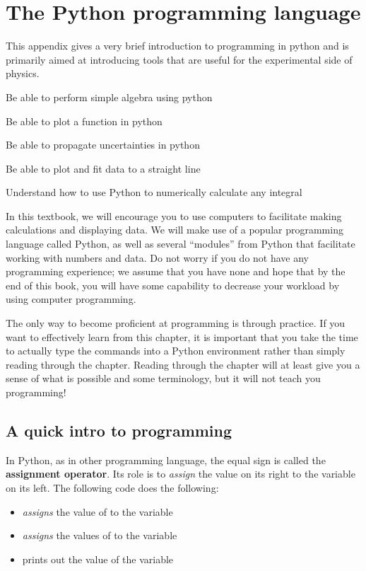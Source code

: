 \chapter{The Python programming language}
\label{app:python}
This appendix gives a very brief introduction to programming in python and is primarily aimed at introducing tools that are useful for the experimental side of physics. 
 \vspace{1cm}
\begin{learningObjectives}
\item Be able to perform simple algebra using python
\item Be able to plot a function in python
\item Be able to propagate uncertainties in python
\item Be able to plot and fit data to a straight line
\item Understand how to use Python to numerically calculate any integral
\end{learningObjectives}

In this textbook, we will encourage you to use computers to facilitate making calculations and displaying data. We will make use of a popular programming language called Python, as well as several ``modules'' from Python that facilitate working with numbers and data. Do not worry if you do not have any programming experience; we assume that you have none and hope that by the end of this book, you will have some capability to decrease your workload by using computer programming.

The only way to become proficient at programming is through practice. If you want to effectively learn from this chapter, it is important that you take the time to actually type the commands into a Python environment rather than simply reading through the chapter. Reading through the chapter will at least give you a sense of what is possible and some terminology, but it will not teach you programming!

\section{A quick intro to programming}
In Python, as in other programming language, the equal sign is called the \textbf{assignment operator}. Its role is to \textit{assign} the value on its right to the variable on its left. The following code does the following:
\begin{itemize}
\item \textit{assigns} the value of  to the variable 
\item \textit{assigns} the values of  to the variable 
\item prints out the value of the variable 
\end{itemize}

